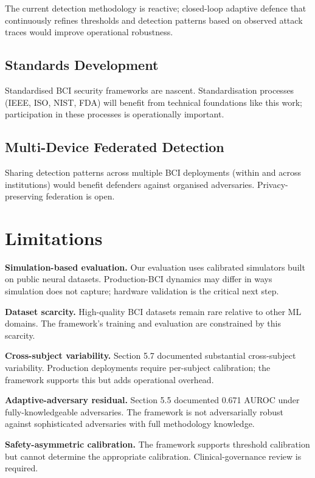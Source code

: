 \documentclass[sigconf,nonacm]{acmart}
\begin{document}
The current detection methodology is reactive; closed-loop
adaptive defence that continuously refines thresholds and
detection patterns based on observed attack traces would improve
operational robustness.

\subsection{Standards Development}

Standardised BCI security frameworks are nascent. Standardisation
processes (IEEE, ISO, NIST, FDA) will benefit from technical
foundations like this work; participation in these processes is
operationally important.

\subsection{Multi-Device Federated Detection}

Sharing detection patterns across multiple BCI deployments
(within and across institutions) would benefit defenders against
organised adversaries. Privacy-preserving federation is open.

\section{Limitations}

\textbf{Simulation-based evaluation.} Our evaluation uses
calibrated simulators built on public neural datasets.
Production-BCI dynamics may differ in ways simulation does not
capture; hardware validation is the critical next step.

\textbf{Dataset scarcity.} High-quality BCI datasets remain rare
relative to other ML domains. The framework's training and
evaluation are constrained by this scarcity.

\textbf{Cross-subject variability.} Section 5.7 documented
substantial cross-subject variability. Production deployments
require per-subject calibration; the framework supports this but
adds operational overhead.

\textbf{Adaptive-adversary residual.} Section 5.5 documented
0.671 AUROC under fully-knowledgeable adversaries. The
framework is not adversarially robust against sophisticated
adversaries with full methodology knowledge.

\textbf{Safety-asymmetric calibration.} The framework supports
threshold calibration but cannot determine the appropriate
calibration. Clinical-governance review is required.
\end{document}
